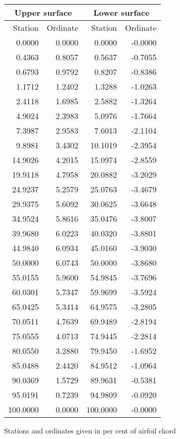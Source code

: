 \documentclass[11pt]{book}
\begin{document}
 \hspace{4mm}
 \begin{tabular}{|r|r|r|r|} \hline 
 \multicolumn{2}{|c|}{Upper surface} & \multicolumn{2}{|c|}{Lower surface} \\
 \hline
 Station & Ordinate & Station & Ordinate \\
 \hline
0.0000 & 0.0000 & 0.0000 & -0.0000 \\
0.4363 & 0.8057 & 0.5637 & -0.7055 \\
0.6793 & 0.9792 & 0.8207 & -0.8386 \\
1.1712 & 1.2402 & 1.3288 & -1.0263 \\
2.4118 & 1.6985 & 2.5882 & -1.3264 \\
4.9024 & 2.3983 & 5.0976 & -1.7664 \\
7.3987 & 2.9583 & 7.6013 & -2.1104 \\
9.8981 & 3.4302 & 10.1019 & -2.3954 \\
14.9026 & 4.2015 & 15.0974 & -2.8559 \\
19.9118 & 4.7958 & 20.0882 & -3.2029 \\
24.9237 & 5.2579 & 25.0763 & -3.4679 \\
29.9375 & 5.6092 & 30.0625 & -3.6648 \\
34.9524 & 5.8616 & 35.0476 & -3.8007 \\
39.9680 & 6.0223 & 40.0320 & -3.8801 \\
44.9840 & 6.0934 & 45.0160 & -3.9030 \\
50.0000 & 6.0743 & 50.0000 & -3.8680 \\
55.0155 & 5.9600 & 54.9845 & -3.7696 \\
60.0301 & 5.7347 & 59.9699 & -3.5924 \\
65.0425 & 5.3414 & 64.9575 & -3.2805 \\
70.0511 & 4.7639 & 69.9489 & -2.8194 \\
75.0555 & 4.0713 & 74.9445 & -2.2814 \\
80.0550 & 3.2880 & 79.9450 & -1.6952 \\
85.0488 & 2.4420 & 84.9512 & -1.0964 \\
90.0369 & 1.5729 & 89.9631 & -0.5381 \\
95.0191 & 0.7239 & 94.9809 & -0.0920 \\
100.0000 & 0.0000 & 100.0000 & -0.0000 \\
 \hline 
 \end{tabular}
 \vspace{8mm}

Stations and ordinates given in per cent of airfoil chord
\end{document}

